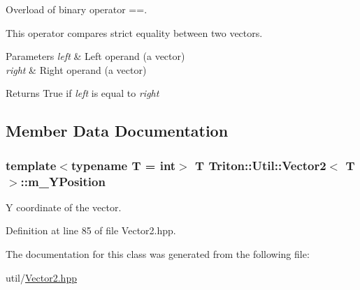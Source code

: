 Overload of binary operator ==. 

This operator compares strict equality between two vectors.


\begin{DoxyParams}{Parameters}
{\em left} & Left operand (a vector) \\
\hline
{\em right} & Right operand (a vector)\\
\hline
\end{DoxyParams}
\begin{DoxyReturn}{Returns}
True if {\itshape left} is equal to {\itshape right} 
\end{DoxyReturn}


\subsection{Member Data Documentation}
\hypertarget{class_triton_1_1_util_1_1_vector2_ae31b6d61a6efc64df0962052a71097b3}{}
\subsubsection[{m\+\_\+\+Y\+Position}]{\setlength{\rightskip}{0pt plus 5cm}template$<$typename T = int$>$ T {\bf Triton\+::\+Util\+::\+Vector2}$<$ T $>$\+::m\+\_\+\+Y\+Position}\label{class_triton_1_1_util_1_1_vector2_ae31b6d61a6efc64df0962052a71097b3}


Y coordinate of the vector. 



Definition at line 85 of file Vector2.\+hpp.



The documentation for this class was generated from the following file\+:\begin{DoxyCompactItemize}
\item 
util/\hyperlink{_vector2_8hpp}{Vector2.\+hpp}\end{DoxyCompactItemize}

